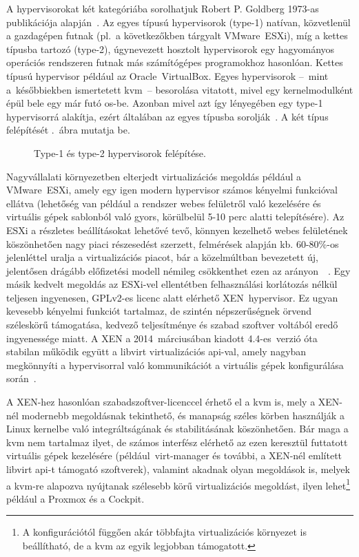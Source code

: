 A \gls{hypervisor}okat két kategóriába sorolhatjuk Robert P. Goldberg 1973-as publikációja alapján~\cite{Goldberg1973Hypervisors}. Az egyes típusú hypervisorok \mbox{(type-1)} natívan, közvetlenül a gazdagépen futnak (pl.~a következőkben tárgyalt VMware~ESXi), míg a kettes típusba tartozó \mbox{(type-2)}, úgynevezett hosztolt hypervisorok egy hagyományos operációs rendszeren futnak más számítógépes programokhoz hasonlóan. Kettes típusú hypervisor például az Oracle~\mbox{VirtualBox}. Egyes hypervisorok --~mint a~későbbiekben ismertetett \acrshort{kvm}~-- besorolása vitatott, mivel egy kernelmodulként épül bele egy már futó \acrshort{os}-be. Azonban mivel azt így lényegében egy type-1 \gls{hypervisor}rá alakítja, ezért általában az egyes típusba sorolják~\cite{WikiHypervisor}. A két típus felépítését .~ábra mutatja be.

\begin{figure}[ht]
	\centering
	
	\caption{Type-1 és type-2 \gls{hypervisor}ok felépítése.}
	\label{fig:hypervisors}
\end{figure}

Nagyvállalati környezetben elterjedt virtualizációs megoldás például a VMware~ESXi, amely egy igen modern \gls{hypervisor} számos kényelmi funkcióval ellátva (lehetőség van például a rendszer webes felületről való kezelésére és virtuális gépek sablonból való gyors, körülbelül 5-10 perc alatti telepítésére). Az ESXi a részletes beállításokat lehetővé tevő, könnyen kezelhető webes felületének köszönhetően nagy piaci részesedést szerzett, felmérések alapján kb. 60-80\%-os jelenléttel uralja a virtualizációs piacot, bár a közelmúltban bevezetett új, jelentősen drágább előfizetési modell némileg csökkenthet ezen az arányon~\cite{VmwareMarketshare}~\cite{VmwareCustomerDecline}.
Egy másik kedvelt megoldás az ESXi-vel ellentétben felhasználási korlátozás nélkül teljesen ingyenesen, GPLv2-es licenc alatt elérhető XEN~\gls{hypervisor}. Ez ugyan kevesebb kényelmi funkciót tartalmaz, de szintén népszerűségnek örvend széleskörű támogatása, kedvező teljesítménye és szabad szoftver voltából eredő ingyenessége miatt. A XEN a 2014~márciusában kiadott 4.4-es~verzió óta stabilan működik együtt a \gls{libvirt} virtualizációs \acrshort{api}-val, amely nagyban megkönnyíti a \gls{hypervisor}ral való kommunikációt a virtuális gépek konfigurálása során~\cite{Xen44ReleaseNotes}.

A XEN-hez hasonlóan szabadszoftver-licenccel érhető el a \acrfull{kvm} is, mely a XEN-nél modernebb megoldásnak tekinthető, és manapság széles körben használják a Linux kernelbe való integráltságának és stabilitásának köszönhetően. Bár maga a \acrshort{kvm} nem tartalmaz ilyet, de számos interfész elérhető az ezen keresztül futtatott virtuális gépek kezelésére (például~virt-manager és további, a XEN-nél említett \gls{libvirt} \acrshort{api}-t támogató  szoftverek), valamint akadnak olyan megoldások is, melyek a \acrshort{kvm}-re alapozva nyújtanak szélesebb körű virtualizációs megoldást, ilyen lehet\footnote{A konfigurációtól függően akár többfajta virtualizációs környezet is beállítható, de a \acrshort{kvm} az egyik legjobban támogatott.} például a Proxmox és a Cockpit.

